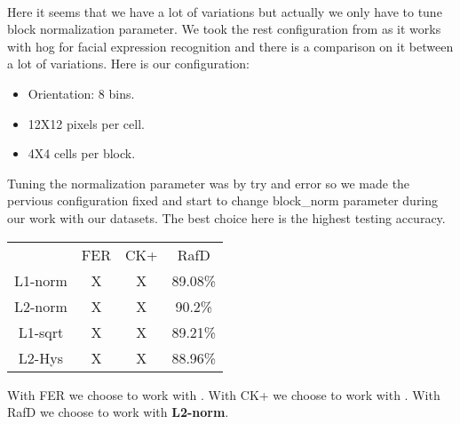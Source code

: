 \paragraph{}
Here it seems that we have a lot of variations but actually we only have to tune block normalization parameter.
\newline
We took the rest configuration from \cite{hog} as it works with hog for facial expression recognition and there is a comparison on it between a lot of variations.
\newline Here is our configuration: \newline
\begin{itemize}
\item Orientation: 8 bins. \item 12X12 pixels per cell. \item 4X4 cells per block.
\end{itemize}

Tuning the normalization parameter was by try and error so we made the pervious configuration fixed and start to change block\_norm parameter during our work with our datasets.
\newline
The best choice here is the highest testing accuracy.
\newline
\begin{center}
\begin{tabular}{ |c|c|c|c| }
\hline
  & FER & CK+ & RafD \\ 
 L1-norm & X & X & 89.08\% \\  
 L2-norm & X & X & 90.2\% \\
 L1-sqrt & X & X & 89.21\% \\
 L2-Hys & X & X & 88.96\% \\
\hline
\end{tabular}
\end{center}
With FER we choose to work with  .\newline
With CK+ we choose to work with  .\newline
With RafD we choose to work with  \textbf{L2-norm}. \newline
\paragraph{}
